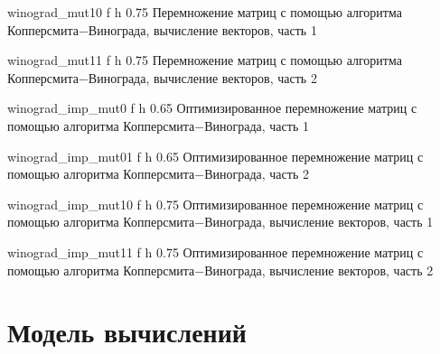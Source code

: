 {winograd_mut10} %
{f} %
{h} %
{0.75\textwidth} %
{Перемножение матриц с помощью алгоритма Копперсмита$-$Винограда, вычисление векторов, часть 1} %
\clearpage

{winograd_mut11} %
{f} %
{h} %
{0.75\textwidth} %
{Перемножение матриц с помощью алгоритма Копперсмита$-$Винограда, вычисление векторов, часть 2} %
\clearpage

{winograd_imp_mut0} %
{f} %
{h} %
{0.65\textwidth} %
{Оптимизированное перемножение матриц с помощью алгоритма Копперсмита$-$Винограда, часть 1} %
\clearpage

{winograd_imp_mut01} %
{f} %
{h} %
{0.65\textwidth} %
{Оптимизированное перемножение матриц с помощью алгоритма Копперсмита$-$Винограда, часть 2} %
\clearpage

{winograd_imp_mut10} %
{f} %
{h} %
{0.75\textwidth} %
{Оптимизированное перемножение матриц с помощью алгоритма Копперсмита$-$Винограда, вычисление векторов, часть 1} %
\clearpage

{winograd_imp_mut11} %
{f} %
{h} %
{0.75\textwidth} %
{Оптимизированное перемножение матриц с помощью алгоритма Копперсмита$-$Винограда, вычисление векторов, часть 2} %
\clearpage

\section{Модель вычислений}

